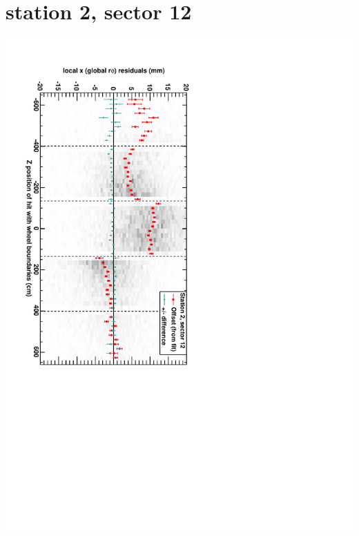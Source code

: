 \documentclass[compress]{beamer}
\begin{document}
\section*{station 2, sector 12}
\begin{frame} \vfill \mbox{\hspace{-1 cm}\includegraphics[height=1.2\linewidth, angle=90]{DTrphiVsZ_st2_sr12.pdf}} \end{frame}
\end{document}
